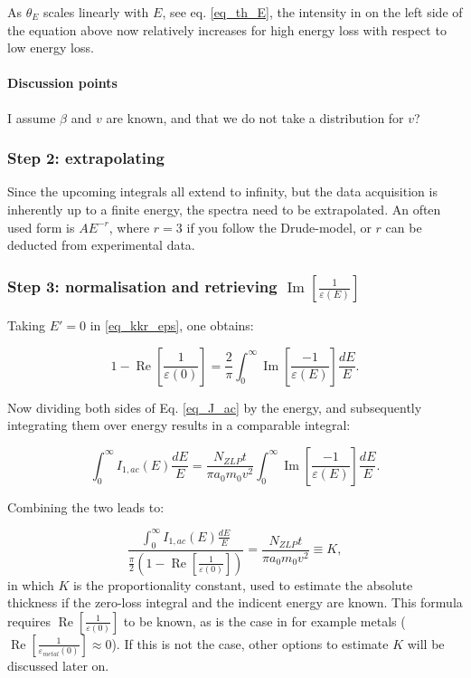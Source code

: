 As $\theta_E$ scales linearly with $E$, see eq. \eqref{eq_th_E}, the intensity in on the left side of the equation above now relatively increases for high energy loss with respect to low energy loss.


\paragraph{Discussion points} I assume $\beta$ and $v$ are known, and that we do not take a distribution for $v$? 


\subsubsection{Step 2: extrapolating}
Since the upcoming integrals all extend to infinity, but the data acquisition is inherently up to a finite energy, the spectra need to be extrapolated. An often used form is $AE^{-r}$, where $r=3$ if you follow the Drude-model, or $r$ can be deducted from experimental data.



\subsubsection{Step 3: normalisation and retrieving $\operatorname{Im}\left[\frac{1}{\varepsilon(E)}\right]$}

Taking $E' = 0$ in \eqref{eq_kkr_eps}, one obtains:

\begin{equation}
    1-\operatorname{Re}\left[\frac{1}{\varepsilon(0)}\right]=\frac{2}{\pi} \int_{0}^{\infty} \operatorname{Im}\left[\frac{-1}{\varepsilon(E)}\right] \frac{d E}{E}.
\end{equation}

Now dividing both sides of Eq. \eqref{eq_J_ac} by the energy, and subsequently integrating them over energy results in a comparable integral:

\begin{equation}\label{eq_J_ac}
    \int_{0}^{\infty} I_{1,ac}(E) \frac{d E}{E}=  \frac{N_{ZLP} t}{\pi a_{0} m_{0} v^{2}}  \int_{0}^{\infty} \operatorname{Im}\left[\frac{-1}{\varepsilon(E)}\right]   \frac{d E}{E} .
\end{equation}

Combining the two leads to:

\begin{equation}
    \frac{\int_{0}^{\infty} I_{1,ac}(E) \frac{d E}{E}}{\frac{\pi}{2}(1-\operatorname{Re}\left[\frac{1}{\varepsilon(0)}\right])} = \frac{N_{ZLP} t}{\pi a_{0} m_{0} v^{2}} \equiv K ,
\end{equation}
in which $K$ is the proportionality constant, used to estimate the absolute thickness if the zero-loss integral and the indicent energy are known. This formula requires $\operatorname{Re}\left[\frac{1}{\varepsilon(0)}\right]$ to be known, as is the case in for example metals ($\operatorname{Re}\left[\frac{1}{\varepsilon_{metal}(0)}\right]\approx 0$). If this is not the case, other options to estimate $K$ will be discussed later on.

